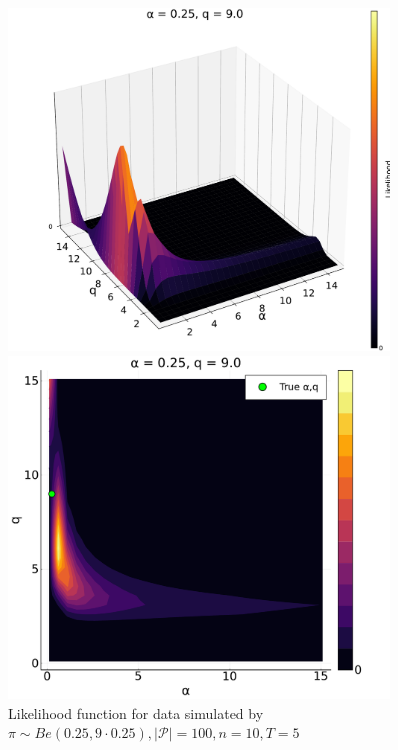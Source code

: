 \documentclass[a4paper, 12pt]{article}
\begin{document}
\begin{figure}
    \centering
    \begin{minipage}{0.55\textwidth}
        \centering
        \includegraphics[width=0.9\textwidth]{../figures/Likelihood_sfplt_0.25.pdf} %
    \end{minipage}\hfill
    \begin{minipage}{0.45\textwidth}
        \centering
        \includegraphics[width=0.9\textwidth]{../figures/Likelihood_contplt_0.25.pdf} %
    \end{minipage}
    \caption{\small Likelihood function for data simulated by $\pi \sim Be(0.25, 9 \cdot 0.25), |\mathcal{P}| = 100, n = 10, T = 5$}
\end{figure}
\end{document}
